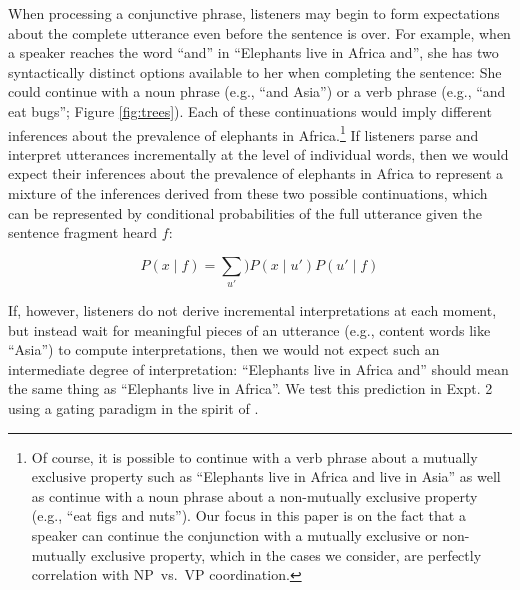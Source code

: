 \documentclass[10pt,letterpaper]{article}
\begin{document}
When processing a conjunctive phrase, listeners may begin to form expectations about the complete utterance even before the sentence is over. 
For example, when a speaker reaches the word ``and'' in ``Elephants live in Africa and'', she has two syntactically distinct options available to her when completing the sentence: She could continue with a noun phrase (e.g., ``and Asia'') or a verb phrase (e.g., ``and eat bugs''; Figure \ref{fig:trees}).
Each of these continuations would imply different inferences about the prevalence of elephants in Africa.\footnote{
	Of course, it is possible to continue with a verb phrase about a mutually exclusive property such as ``Elephants live in Africa and live in Asia'' as well as continue with a noun phrase about a non-mutually exclusive property (e.g., ``eat figs and nuts''). Our focus in this paper is on the fact that a speaker can continue the conjunction with a mutually exclusive or non-mutually exclusive property, which in the cases we consider, are perfectly correlation with NP~vs.~VP coordination.
}
If listeners parse and interpret utterances incrementally at the level of individual words, then we would expect their inferences about the prevalence of elephants in Africa to represent a mixture of the inferences derived from these two possible continuations, which can be represented by conditional probabilities of the full utterance given the sentence fragment heard $f$:

\begin{equation}
P(x \mid f) = \sum_{u'}) P(x \mid u') P(u' \mid f) 
\label{eq:L0a}
\end{equation}

If, however, listeners do not derive incremental interpretations at each moment, but instead wait for meaningful pieces of an utterance (e.g., content words like ``Asia'') to compute interpretations, then we would not expect such an intermediate degree of interpretation: ``Elephants live in Africa and'' should mean the same thing as ``Elephants live in Africa''. 
We test this prediction in Expt. 2 using a gating paradigm in the spirit of .
\end{document}
